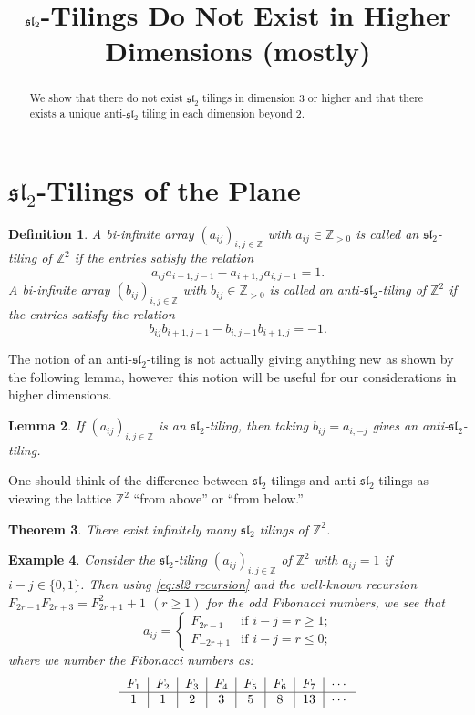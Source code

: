 \documentclass{amsart}
\title{$\fsl_2$-Tilings Do Not Exist in Higher Dimensions (mostly)}
\newtheorem{theorem}{Theorem}
\newtheorem{definition}[theorem]{Definition}
\newtheorem{example}[theorem]{Example}
\newtheorem{lemma}[theorem]{Lemma}
\newcommand{\fsl}{\mathfrak{sl}}
\newcommand{\ZZ}{\mathbb{Z}}
\begin{document}
  \begin{abstract}
    We show that there do not exist $\fsl_2$ tilings in dimension 3 or higher and that there exists a unique anti-$\fsl_2$ tiling in each dimension beyond 2.
  \end{abstract}
  \maketitle

  \section{$\fsl_2$-Tilings of the Plane}
    \begin{definition}
      A bi-infinite array $(a_{ij})_{i,j\in\ZZ}$ with $a_{ij}\in\ZZ_{>0}$ is called an \emph{$\fsl_2$-tiling of $\ZZ^2$} if the entries satisfy the relation
      \begin{equation}\label{eq:sl2 recursion}
        a_{ij}a_{i+1,j-1}-a_{i+1,j}a_{i,j-1}=1.
      \end{equation}
      A bi-infinite array $(b_{ij})_{i,j\in\ZZ}$ with $b_{ij}\in\ZZ_{>0}$  is called an \emph{anti-$\fsl_2$-tiling of $\ZZ^2$} if the entries satisfy the relation
      \begin{equation}\label{eq:anti-sl2 recursion}
        b_{ij}b_{i+1,j-1}-b_{i,j-1}b_{i+1,j}=-1.
      \end{equation}
    \end{definition}
    The notion of an anti-$\fsl_2$-tiling is not actually giving anything new as shown by the following lemma, however this notion will be useful for our considerations in higher dimensions.
    \begin{lemma}
      If $(a_{ij})_{i,j\in\ZZ}$ is an $\fsl_2$-tiling, then taking $b_{ij}=a_{i,-j}$ gives an anti-$\fsl_2$-tiling.
    \end{lemma}
    One should think of the difference between $\fsl_2$-tilings and anti-$\fsl_2$-tilings as viewing the lattice $\ZZ^2$ ``from above'' or ``from below.''
    \begin{theorem}
      There exist infinitely many $\fsl_2$ tilings of $\ZZ^2$.
    \end{theorem}

    \begin{example}\label{ex:Fibonacci}
      Consider the $\fsl_2$-tiling $(a_{ij})_{i,j\in\ZZ}$ of $\ZZ^2$ with $a_{ij}=1$ if $i-j\in\{0,1\}$.  Then using \eqref{eq:sl2 recursion} and the well-known recursion $F_{2r-1}F_{2r+3}=F_{2r+1}^2+1$ $(r\ge1)$ for the odd Fibonacci numbers, we see that
      \[a_{ij}=\begin{cases}F_{2r-1} & \text{if $i-j=r\ge1$;}\\F_{-2r+1} & \text{if $i-j=r\le0$;}\end{cases}\]
      where we number the Fibonacci numbers as:
      \[\begin{tabular}{|c|c|c|c|c|c|c|c} $F_1$ & $F_2$ & $F_3$ & $F_4$ & $F_5$ & $F_6$ & $F_7$ & $\cdots$\\\hline 1 & 1 & 2 & 3 & 5 & 8 & 13 & $\cdots$\end{tabular}\]
    \end{example}
\end{document}
